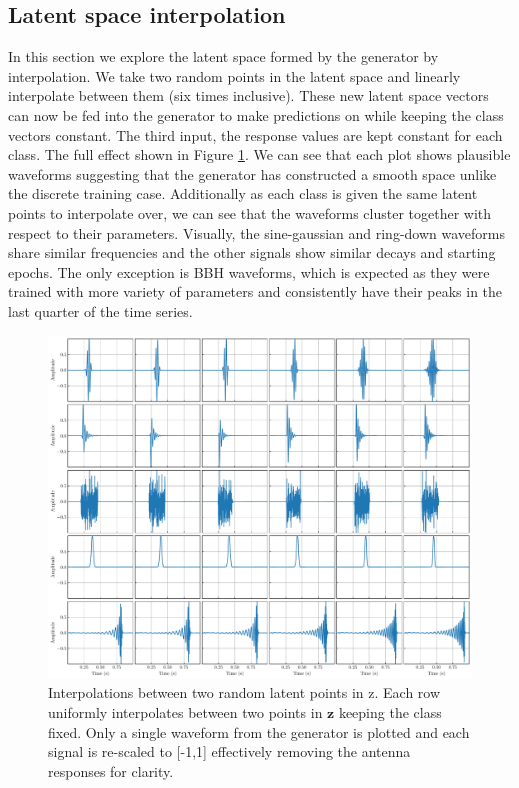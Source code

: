 \documentclass[12pt]{iopart}
\begin{document}
\subsection{Latent space interpolation}
In this section we explore the latent space formed by the generator by interpolation. We take two random points in the latent space and linearly interpolate between them (six times inclusive). These new latent space vectors can now be fed into the generator to make predictions on while keeping the class vectors constant. The third input, the response values are kept constant for each class. The full effect shown in Figure \ref{fig:z_interp}. We can see that each plot shows plausible waveforms suggesting that the generator has constructed a smooth space unlike the discrete training case. Additionally as each class is given the same latent points to interpolate over, we can see that the waveforms cluster together with respect to their parameters. Visually, the sine-gaussian and ring-down waveforms share similar frequencies and the other signals show similar decays and starting epochs. The only exception is BBH waveforms, which is expected as they were trained with more variety of parameters and consistently have their peaks in the last quarter of the time series.

\begin{figure}[ht]
    \centering
    \includegraphics[width=\textwidth]{figures/z_interp_fix_c.pdf}
    \caption{Interpolations between two random latent points in z. Each row uniformly interpolates between two points in $\mathbf{z}$ keeping the class fixed. Only a single waveform from the generator is plotted and each signal is re-scaled to [-1,1] effectively removing the antenna responses for clarity.}
    \label{fig:z_interp}
\end{figure}
\end{document}
